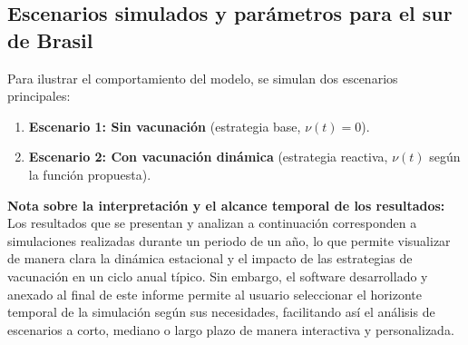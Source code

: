 \documentclass[12pt,a4paper]{article}
\begin{document}
\subsection{Escenarios simulados y parámetros para el sur de Brasil}

Para ilustrar el comportamiento del modelo, se simulan dos escenarios principales:
\begin{enumerate}
    \item \textbf{Escenario 1: Sin vacunación} (estrategia base, $\nu(t) = 0$).
    \item \textbf{Escenario 2: Con vacunación dinámica} (estrategia reactiva, $\nu(t)$ según la función propuesta).
\end{enumerate}

\textbf{Nota sobre la interpretación y el alcance temporal de los resultados:} Los resultados que se presentan y analizan a continuación corresponden a simulaciones realizadas durante un periodo de un año, lo que permite visualizar de manera clara la dinámica estacional y el impacto de las estrategias de vacunación en un ciclo anual típico. Sin embargo, el software desarrollado y anexado al final de este informe permite al usuario seleccionar el horizonte temporal de la simulación según sus necesidades, facilitando así el análisis de escenarios a corto, mediano o largo plazo de manera interactiva y personalizada.
\end{document}
